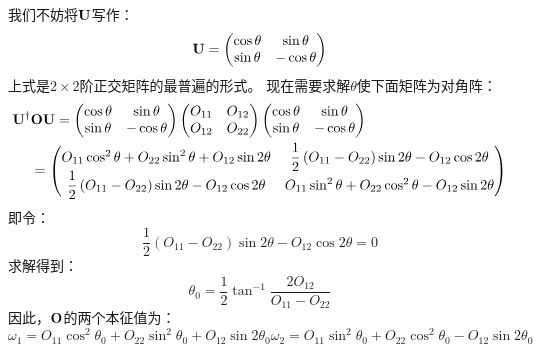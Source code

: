 我们不妨将$\mathbf U$写作：
\begin{equation}
 \mathbf U = \begin{pmatrix}
     \cos{\theta} &\sin\theta \\ \sin\theta &-\cos\theta
 \end{pmatrix}
 \label{eq:1.104}
\end{equation}
上式是$2\times2$阶正交矩阵的最普遍的形式。
现在需要求解$\theta$使下面矩阵为对角阵：
\[
\begin{split}
 \mathbf U^\dagger&\mathbf{O}\mathbf{U} = \begin{pmatrix}
     \cos\theta &\sin\theta \\ \sin\theta &-\cos\theta
 \end{pmatrix} \begin{pmatrix}
     O_{11} & O_{12} \\ O_{12} & O_{22}
 \end{pmatrix} \begin{pmatrix}
     \cos\theta &\sin\theta \\ \sin\theta &-\cos\theta
 \end{pmatrix} \\
 &= \begin{pmatrix}
     O_{11}\cos^2\theta + O_{22}\sin^2\theta + O_{12}\sin{2\theta} 
     &\displaystyle\frac{1}{2}\left(O_{11}-O_{22}\right)\sin{2\theta}-O_{12}\cos{2\theta} \\
     \displaystyle\frac{1}{2}\left(O_{11}-O_{22}\right)\sin{2\theta}-O_{12}\cos{2\theta} 
     &O_{11}\sin^2\theta +O_{22}\cos^2\theta-O_{12}\sin{2\theta}
 \end{pmatrix}
\end{split}
\]
即令：
\[
\frac{1}{2}\left(O_{11}-O_{22}\right)\sin{2\theta} - O_{12}\cos{2\theta} = 0
\]
求解得到：
\begin{equation}
 \theta_0 = \frac{1}{2}\tan^{-1}\frac{2O_{12}}{O_{11}-O_{22}}
 \label{eq:1.105}
\end{equation}
因此，$\mathbf O$的两个本征值为：
\begin{subequations}
 \begin{equation}
     \omega_1 = O_{11}\cos^2\theta_0 + O_{22}\sin^2\theta_0 + O_{12}\sin{2\theta_0}
     \label{eq:1.106a}
 \end{equation}
 \begin{equation}
     \omega_2 = O_{11}\sin^2\theta_0 + O_{22}\cos^2\theta_0 - O_{12}\sin{2\theta_0}
     \label{eq:1.106b}
 \end{equation}
 \label{eq:1.106}
\end{subequations}
